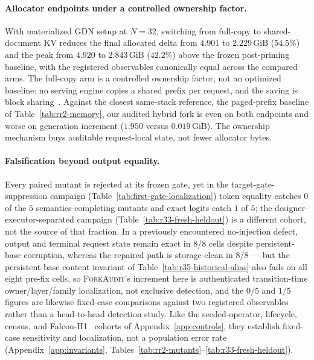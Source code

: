 \documentclass{article}
\newcommand{\method}{\textsc{ForkAudit}}
\newcommand{\gib}{\,\mathrm{GiB}}
\begin{document}
\paragraph{Allocator endpoints under a controlled ownership factor.}
With materialized GDN setup at $N=32$, switching from full-copy to
shared-document KV reduces the final allocated delta from $4.901$ to
$2.229\gib$ ($54.5\%$) and the peak from $4.920$ to $2.843\gib$ ($42.2\%$)
above the frozen post-priming baseline, with the registered observables
canonically equal across the compared arms.  The full-copy arm is a controlled
ownership factor, not an optimized baseline: no serving engine copies a shared
prefix per request, and the saving is block
sharing~\citep{kwon2023pagedattention}.  Against the closest same-stack
reference, the paged-prefix baseline of Table~\ref{tab:rr2-memory}, our audited
hybrid fork is even on both endpoints and worse on generation increment
($1.950$ versus $0.019\gib$).  The ownership mechanism buys auditable
request-local state, not fewer allocator bytes.

\paragraph{Falsification beyond output equality.}
Every paired mutant is rejected at its frozen gate, yet in the
target-gate-suppression campaign (Table~\ref{tab:first-gate-localization})
token equality catches $0$ of the $5$ semantics-completing mutants and exact
logits catch $1$ of $5$; the designer--executor-separated campaign
(Table~\ref{tab:r33-fresh-heldout}) is a different cohort, not the source of
that fraction.  In a previously encountered no-injection defect, output and
terminal request state remain exact in 8/8 cells despite persistent-base
corruption, whereas the repaired path is storage-clean in 8/8 --- but the
persistent-base content invariant of Table~\ref{tab:r35-historical-alias} also
fails on all eight pre-fix cells, so \method{}'s increment here is
authenticated transition-time owner/layer/family localization, not exclusive
detection, and the $0/5$ and $1/5$ figures are likewise fixed-case comparisons
against two registered observables rather than a head-to-head detection study.
Like the seeded-operator, lifecycle, census, and
Falcon-H1~\citep{zuo2025falconh1} cohorts of Appendix~\ref{app:controls}, they
establish fixed-case sensitivity and localization, not a population error rate
(Appendix~\ref{app:invariants}, Tables~\ref{tab:rr2-mutants}--\ref{tab:r33-fresh-heldout}).
\end{document}
